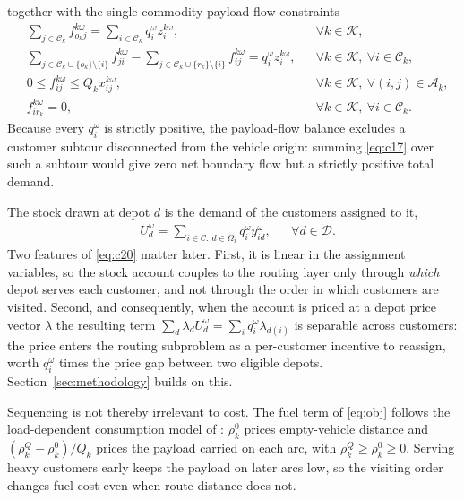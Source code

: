\documentclass[authoryear,final,3p,times]{elsarticle}
\theoremstyle{definition}
\theoremstyle{plain}
\begin{document}
together with the single-commodity payload-flow constraints
\begin{align}
&\sum_{j\in\mathcal C_k}f_{o_kj}^{k\omega}
 =\sum_{i\in\mathcal C_k}q_i^\omega z_i^{k\omega},
&&\forall k\in\mathcal K,
\label{eq:c16}\\
&\sum_{j\in\mathcal C_k\cup\{o_k\}\setminus\{i\}}
 f_{ji}^{k\omega}
 -\sum_{j\in\mathcal C_k\cup\{r_k\}\setminus\{i\}}
 f_{ij}^{k\omega}
 =q_i^\omega z_i^{k\omega},
&&\forall k\in\mathcal K,\ \forall i\in\mathcal C_k,
\label{eq:c17}\\
&0\le f_{ij}^{k\omega}\le Q_k x_{ij}^{k\omega},
&&\forall k\in\mathcal K,\ \forall(i,j)\in\mathcal A_k,
\label{eq:c19a}\\
&f_{ir_k}^{k\omega}=0,
&&\forall k\in\mathcal K,\ \forall i\in\mathcal C_k.
\label{eq:c19b}
\end{align}
Because every $q_i^\omega$ is strictly positive, the payload-flow balance
excludes a customer subtour disconnected from the vehicle origin: summing
\eqref{eq:c17} over such a subtour would give zero net boundary flow but a
strictly positive total demand.

The stock drawn at depot $d$ is the demand of the customers assigned to it,
\begin{align}
&U_d^\omega=\sum_{i\in\mathcal C:\,d\in\Omega_i}q_i^\omega y_{id}^\omega,
&&\forall d\in\mathcal D.
\label{eq:c20}
\end{align}
Two features of \eqref{eq:c20} matter later.  First, it is linear in the
assignment variables, so the stock account couples to the routing layer only
through \emph{which} depot serves each customer, and not through the order in
which customers are visited.  Second, and consequently, when the account is
priced at a depot price vector $\lambda$ the resulting term
$\sum_d\lambda_dU_d^\omega=\sum_iq_i^\omega\lambda_{d(i)}$ is separable across
customers: the price enters the routing subproblem as a per-customer incentive
to reassign, worth $q_i^\omega$ times the price gap between two eligible
depots.  Section~\ref{sec:methodology} builds on this.

Sequencing is not thereby irrelevant to cost.  The fuel term of \eqref{eq:obj}
follows the load-dependent consumption model of \citet{bektas2011pollution}:
$\rho_k^0$ prices empty-vehicle distance and $(\rho_k^Q-\rho_k^0)/Q_k$ prices
the payload carried on each arc, with $\rho_k^Q\ge\rho_k^0\ge0$.  Serving heavy
customers early keeps the payload on later arcs low, so the visiting order
changes fuel cost even when route distance does not.
\end{document}
